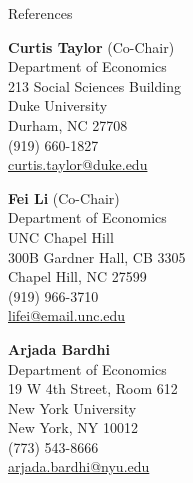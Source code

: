 \begin{rSection}{References}
	
	\medskip 
	
	\begin{minipage}{.31\linewidth}
		{\large \textbf{Curtis Taylor} (Co-Chair)}	\\[3pt]
		Department of Economics	\\		
		213 Social Sciences Building\\		
		Duke University\\		
		Durham, NC 27708\\[3pt]
		(919) 660-1827\\[3pt]
		\href{mailto:curtis.taylor@duke.edu}{curtis.taylor@duke.edu}
	\end{minipage}
	\hspace*{2pt}
	\begin{minipage}{.31\linewidth}
		{\large \textbf{Fei Li} (Co-Chair) }	\\[3pt]
		Department of Economics\\
		UNC Chapel Hill\\
		300B Gardner Hall, CB 3305\\
		Chapel Hill, NC 27599\\[3pt]
		(919) 966-3710\\[3pt]
		\href{mailto:lifei@email.unc.edu}{lifei@email.unc.edu}
	\end{minipage}
	\hspace*{2pt}
	\begin{minipage}{.31\linewidth}
		{\large \textbf{Arjada Bardhi}}	\\[3pt]
		Department of Economics	\\		
		19 W 4th Street, Room 612\\		
		New York University\\		
		New York, NY 10012\\[3pt]
		(773) 543-8666\\[3pt]
		\href{mailto:arjada.bardhi@nyu.edu}{arjada.bardhi@nyu.edu}
	\end{minipage}
\end{rSection}